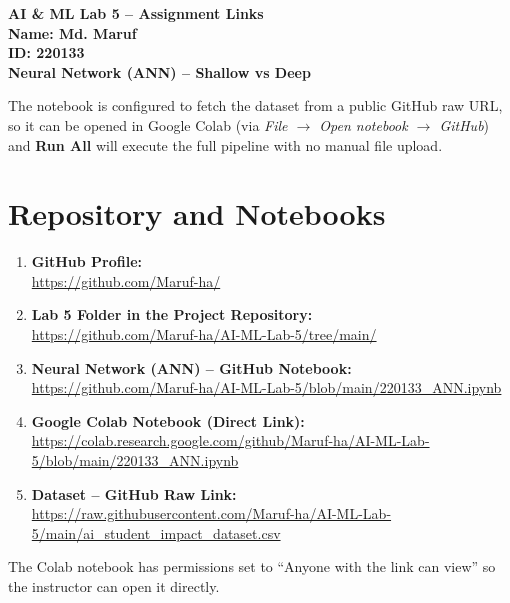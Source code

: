 \documentclass[11pt]{article}
\begin{document}
\begin{center}
    {\huge \textbf{AI \& ML Lab 5 -- Assignment Links}} \\[0.3cm]
    {\Large \textbf{Name: Md. Maruf}} \\[0.1cm]
    {\Large \textbf{ID: 220133}} \\[0.4cm]
    {\large \textbf{Neural Network (ANN) -- Shallow vs Deep}} \\[0.5cm]
\end{center}

\noindent The notebook is configured to fetch the dataset from a public GitHub raw URL,
so it can be opened in Google Colab (via \emph{File $\rightarrow$ Open notebook
$\rightarrow$ GitHub}) and \textbf{Run All} will execute the full pipeline with no
manual file upload.

\section*{Repository and Notebooks}

\begin{enumerate}[leftmargin=*, itemsep=0.3cm]

    \item \textbf{GitHub Profile:} \\
    \url{https://github.com/Maruf-ha/}

    \item \textbf{Lab 5 Folder in the Project Repository:} \\
    \url{https://github.com/Maruf-ha/AI-ML-Lab-5/tree/main/}

    \item \textbf{Neural Network (ANN) -- GitHub Notebook:} \\
    \url{https://github.com/Maruf-ha/AI-ML-Lab-5/blob/main/220133_ANN.ipynb}

    \item \textbf{Google Colab Notebook (Direct Link):} \\
    \url{https://colab.research.google.com/github/Maruf-ha/AI-ML-Lab-5/blob/main/220133_ANN.ipynb}

    \item \textbf{Dataset -- GitHub Raw Link:} \\
    \url{https://raw.githubusercontent.com/Maruf-ha/AI-ML-Lab-5/main/ai_student_impact_dataset.csv}

\end{enumerate}

\noindent The Colab notebook has permissions set to ``Anyone with the link can view''
so the instructor can open it directly.
\end{document}
